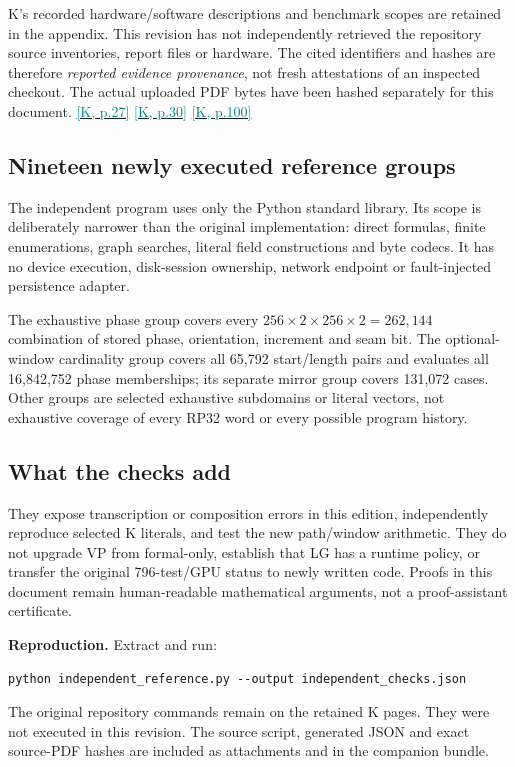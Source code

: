 \documentclass[11pt,a4paper]{article}
\newcommand{\kref}[1]{\hyperlink{baseline.#1}{\textcolor{teal}{[K, p.#1]}}}
\newcommand{\code}[1]{\texttt{\detokenize{#1}}}
\theoremstyle{lpstyle}
\begin{document}
K's recorded hardware/software descriptions and benchmark scopes are retained in the appendix. This revision has not independently retrieved the repository source inventories, report files or hardware. The cited identifiers and hashes are therefore \emph{reported evidence provenance}, not fresh attestations of an inspected checkout. The actual uploaded PDF bytes have been hashed separately for this document. \kref{27} \kref{30} \kref{100}

\subsection{Nineteen newly executed reference groups}
The independent program uses only the Python standard library. Its scope is deliberately narrower than the original implementation: direct formulas, finite enumerations, graph searches, literal field constructions and byte codecs. It has no device execution, disk-session ownership, network endpoint or fault-injected persistence adapter.



The exhaustive phase group covers every $256\times2\times256\times2=262{,}144$ combination of stored phase, orientation, increment and seam bit. The optional-window cardinality group covers all 65,792 start/length pairs and evaluates all 16,842,752 phase memberships; its separate mirror group covers 131,072 cases. Other groups are selected exhaustive subdomains or literal vectors, not exhaustive coverage of every RP32 word or every possible program history.

\subsection{What the checks add}
They expose transcription or composition errors in this edition, independently reproduce selected K literals, and test the new path/window arithmetic. They do not upgrade VP from formal-only, establish that LG has a runtime policy, or transfer the original 796-test/GPU status to newly written code. Proofs in this document remain human-readable mathematical arguments, not a proof-assistant certificate.

\begin{scopebox}
\textbf{Reproduction.} Extract \code{independent_reference.py} and run:
\begin{lstlisting}
python independent_reference.py --output independent_checks.json
\end{lstlisting}
The original repository commands remain on the retained K pages. They were not executed in this revision. The source script, generated JSON and exact source-PDF hashes are included as attachments and in the companion bundle.
\end{scopebox}
\end{document}
